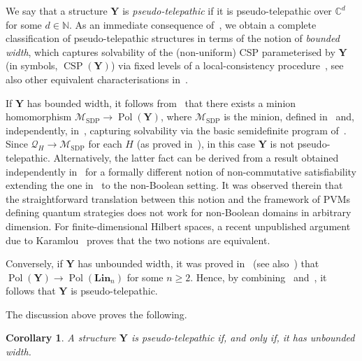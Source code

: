 \documentclass[11pt]{article}
\DeclareMathOperator{\CSP}{CSP}
\newcommand{\C}{\mathbb C}
\newcommand{\N}{\mathbb N}
\newcommand{\Y}{\mathbf Y}
\newcommand{\Lin}{\mathbf{Lin}}
\DeclareMathOperator{\Pol}{Pol}
\DeclareMathOperator{\SDP}{SDP}
\newcommand{\minion}[1]{{\mathcal #1}}
\theoremstyle{plain}
\newtheorem{corollary}[theorem]{Corollary}
\theoremstyle{definition}
\theoremstyle{remark}
\begin{document}
We say that a structure $\Y$ is \textit{pseudo-telepathic} if it is pseudo-telepathic over $\C^d$ for some $d\in\N$. As an immediate consequence of~, we obtain a complete classification of pseudo-telepathic structures in terms of the notion of \textit{bounded width}, which captures solvability of the (non-uniform) CSP parameterised by $\Y$ (in symbols, $\CSP(\Y)$) via
fixed levels of a local-consistency procedure~\cite{Feder98:monotone}, see also other equivalent characterisations in~\cite{AtseriasO19,tz17:sicomp,Kolaitis00:jcss,Bulatov08:dulaties,Barto16:sicomp}.

If $\Y$ has bounded width, it follows from~\cite{Barto16:sicomp} that
there exists a minion homomorphism $\minion M_{\SDP}\to\Pol(\Y)$, where $\minion M_{\SDP}$ is the minion, defined in~\cite{cz23soda:minions} and, independently, in~\cite{BrakensiekGS23}, capturing solvability via the basic semidefinite program of~\cite{Raghavendra08:everycsp}. Since $\minion Q_H\to\minion M_{\SDP}$ for each $H$ (as proved in~\cite[Theorem~24]{ciardo_quantum_minion}), in this case $\Y$ is not pseudo-telepathic. Alternatively, the latter fact can be derived from a result obtained independently in~\cite[Theorem~12]{bulatov2025satisfiability} for a formally different notion of non-commutative satisfiability extending the one in~\cite{AtseriasKS19} to the non-Boolean setting. It was observed therein that 
the straightforward translation between this notion and the framework of PVMs defining quantum strategies does not work for non-Boolean domains in arbitrary dimension. For finite-dimensional Hilbert spaces, a recent unpublished argument due to Karamlou~\cite{karamlou_2026_personal} proves that the two notions are equivalent.
%

Conversely, if $\Y$ has unbounded width, it was proved in~\cite{barto2009constraint} (see also~\cite{BOP18}) that $\Pol(\Y)\to\Pol(\Lin_n)$ for some $n\geq 2$. Hence, by combining~ and~, it follows that $\Y$ is pseudo-telepathic. 

The discussion above proves the following.





\begin{corollary}
\label{cor_unbounded_width}
    A structure $\Y$ is pseudo-telepathic if, and only if, it has unbounded width.
\end{corollary}
\end{document}
